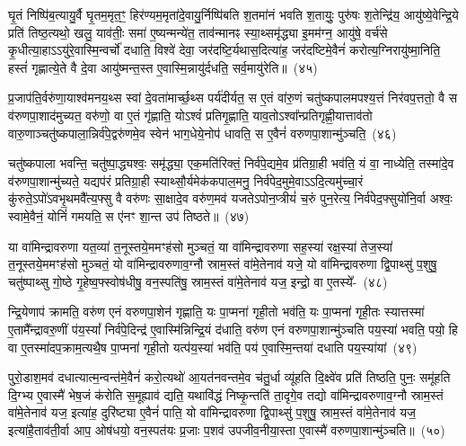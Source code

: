 घृ॒तं निष्पि॑ब॒त्यायु॒र्वै घृ॒तम॒मृत॒ꣳ॒ हिर॑ण्यम॒मृता॑दे॒वायु॒र्निष्पि॑बति श॒तमा॑नं भवति श॒तायुः॒ पुरु॑षः श॒तेन्द्रि॑य॒ आयु॑ष्ये॒वेन्द्रि॒ये प्रति॑ तिष्ठ॒त्यथो॒ खलु॒ याव॑तीः॒ समा॑ ए॒ष्यन्मन्ये॑त॒ ताव॑न्मानꣴ स्या॒थ्समृ॑द्ध्या इ॒मम॑ग्न॒ आयु॑षे॒ वर्च॑से कृ॒धीत्या॒हा\-ऽऽ\-यु॑रे॒वास्मि॒न्वर्चो॑ दधाति॒ विश्वे॑ देवा॒ जर॑दष्टि॒र्यथास॒दित्या॑ह॒ जर॑दष्टिमे॒वैनं॑ करोत्य॒ग्निरायु॑ष्मा॒निति॒ हस्तं॑ गृह्णात्ये॒ते वै दे॒वा आयु॑ष्मन्त॒स्त ए॒वास्मि॒न्नायु॑र्दधति॒ सर्व॒मायु॑रेति॥~(४५)\ip

{\anuvakamend[{रसं॑ दे॒वाना॒ꣴ॒ स्तोमे॒नेति॒ हिर॑ण्या॒दस॒दिति॒ द्वाविꣳ॑शतिश्च}]}%

प्र॒जा\-प॑ति॒र्वरु॑णा॒याश्व॑मनय॒थ्स स्वां दे॒वता॑मार्च्छ॒थ्स पर्य॑दीर्यत॒ स ए॒तं वा॑रु॒णं चतु॑ष्कपालमपश्य॒त्तं निर॑वप॒त्ततो॒ वै स व॑रुणपा॒शाद॑मुच्यत॒ वरु॑णो॒ वा ए॒तं गृ॑ह्णाति॒ यो\-ऽश्वं॑ प्रतिगृ॒ह्णाति॒ याव॒तो\-ऽश्वा᳚न्प्रतिगृह्णी॒यात्ताव॑तो वारु॒णाञ्चतु॑ष्कपाला॒न्निर्व॑पे॒द्वरु॑णमे॒व स्वेन॑ भाग॒धेये॒नोप॑ धावति॒ स ए॒वैनं॑ वरुणपा॒शान्मु॑ञ्चति॒~(४६)\ip

चतु॑ष्कपाला भवन्ति॒ चतु॑ष्पा॒द्ध्यश्वः॒ समृ॑द्ध्या॒ एक॒मति॑रिक्तं॒ निर्व॑पे॒द्यमे॒व प्र॑तिग्रा॒ही भव॑ति॒ यं वा॒ नाध्येति॒ तस्मा॑दे॒व व॑रुणपा॒शान्मु॑च्यते॒ यद्यप॑रं प्रतिग्रा॒ही स्याथ्सौ॒र्यमेक॑कपाल॒मनु॒ निर्व॑पेद॒मुमे॒वा\-ऽऽ\-दि॒त्यमु॑च्चा॒रं कु॑रुते॒\-ऽपो॑\-ऽवभृ॒थमवै᳚त्य॒फ्सु वै वरु॑णः सा॒क्षादे॒व वरु॑ण॒मव॑ यजते\-ऽपोन॒प्त्रीयं॑ च॒रुं पुन॒रेत्य॒ निर्व॑पेद॒फ्सुयो॑नि॒र्वा अश्वः॒ स्वामे॒वैनं॒ योनिं॑ गमयति॒ स ए॑नꣳ शा॒न्त उप॑ तिष्ठते॥~(४७)\ip

{\anuvakamend[{मु॒ञ्च॒ति॒ च॒रुꣳ स॒प्तद॑श च}]}%

या वा॑मिन्द्रावरुणा यत॒व्या॑ त॒नूस्तये॒ममꣳह॑सो मुञ्चतं॒ या वा॑मिन्द्रावरुणा सह॒स्या॑ रक्ष॒स्या॑ तेज॒स्या॑ त॒नूस्तये॒ममꣳह॑सो मुञ्चतं॒ यो वा॑मिन्द्रावरुणाव॒ग्नौ स्राम॒स्तं वा॑मे॒तेनाव॑ यजे॒ यो वा॑मिन्द्रावरुणा द्वि॒पाथ्सु॑ प॒शुषु॒ चतु॑ष्पाथ्सु गो॒ष्ठे गृ॒हेष्व॒फ्स्वोष॑धीषु॒ वन॒स्पति॑षु॒ स्राम॒स्तं वा॑मे॒तेनाव॑ यज॒ इन्द्रो॒ वा ए॒तस्ये᳚-~(४८)\ip

न्द्रि॒येणाप॑ क्रामति॒ वरु॑ण एनं वरुणपा॒शेन॑ गृह्णाति॒ यः पा॒प्मना॑ गृही॒तो भव॑ति॒ यः पा॒प्मना॑ गृही॒तः स्यात्तस्मा॑ ए॒तामै᳚न्द्रावरु॒णीं प॑य॒स्यां᳚ निर्व॑पे॒दिन्द्र॑ ए॒वास्मि॑न्निन्द्रि॒यं द॑धाति॒ वरु॑ण एनं वरुणपा॒शान्मु॑ञ्चति पय॒स्या॑ भवति॒ पयो॒ हि वा ए॒तस्मा॑दप॒क्राम॒त्यथै॒ष पा॒प्मना॑ गृही॒तो यत्प॑य॒स्या॑ भव॑ति॒ पय॑ ए॒वास्मि॒न्तया॑ दधाति पय॒स्या॑यां~(४९)\ip

पुरो॒डाश॒मव॑ दधात्यात्म॒न्वन्त॑मे॒वैनं॑ करो॒त्यथो॑ आ॒यत॑नवन्तमे॒व च॑तु॒र्धा व्यू॑हति दि॒क्ष्वे॑व प्रति॑ तिष्ठति॒ पुनः॒ समू॑हति दि॒ग्भ्य ए॒वास्मै॑ भेष॒जं क॑रोति स॒मूह्याव॑ द्यति॒ यथावि॑द्धं निष्कृ॒न्तति॑ ता॒दृगे॒व तद्यो वा॑मिन्द्रावरुणाव॒ग्नौ स्राम॒स्तं वा॑मे॒तेनाव॑ यज॒ इत्या॑ह॒ दुरि॑ष्ट्या ए॒वैनं॑ पाति॒ यो वा॑मिन्द्रावरुणा द्वि॒पाथ्सु॑ प॒शुषु॒ स्राम॒स्तं वा॑मे॒तेनाव॑ यज॒ इत्या॑है॒ताव॑ती॒र्वा आप॒ ओष॑धयो॒ वन॒स्पत॑यः प्र॒जाः प॒शव॑ उपजीव॒नीया॒स्ता ए॒वास्मै॑ वरुणपा॒शान्मु॑ञ्चति॥~(५०)\ip


